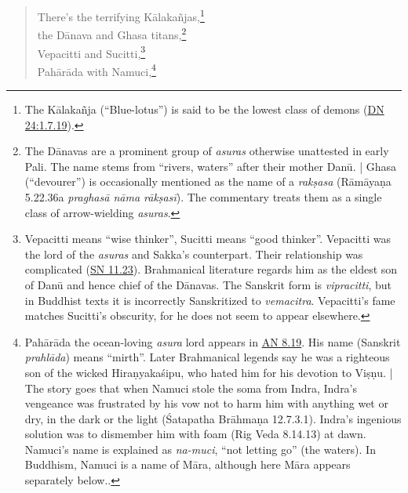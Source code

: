 \documentclass[12pt,openany]{book}%
\begin{document}
\begin{verse}
There’s the terrifying \textsanskrit{Kālakañjas},\footnote{The \textsanskrit{Kālakañja} (“Blue-lotus”) is said to be the lowest class of demons (\href{https://suttacentral.net/dn24/en/sujato\#1.7.19}{DN 24:1.7.19}). } \\
the \textsanskrit{Dānava} and Ghasa titans,\footnote{The \textsanskrit{Dānavas} are a prominent group of \textit{asuras} otherwise unattested in early Pali. The name stems from “rivers, waters” after their mother \textsanskrit{Danū}. | Ghasa (“devourer”) is occasionally mentioned as the name of a \textit{\textsanskrit{rakṣasa}} (\textsanskrit{Rāmāyaṇa} 5.22.36a \textit{\textsanskrit{praghasā} \textsanskrit{nāma} \textsanskrit{rākṣasī}}). The commentary treats them as a single class of arrow-wielding \textit{asuras}. } \\
Vepacitti and Sucitti,\footnote{Vepacitti means “wise thinker”, Sucitti means “good thinker”. Vepacitti was the lord of the \textit{asuras} and Sakka’s counterpart. Their relationship was complicated (\href{https://suttacentral.net/sn11.23/en/sujato}{SN 11.23}). Brahmanical literature regards him as the eldest son of \textsanskrit{Danū} and hence chief of the \textsanskrit{Dānavas}. The Sanskrit form is \textit{vipracitti}, but in Buddhist texts it is incorrectly Sanskritized to \textit{vemacitra}. Vepacitti’s fame matches Sucitti’s obscurity, for he does not seem to appear elsewhere. } \\
\textsanskrit{Pahārāda} with Namuci,\footnote{\textsanskrit{Pahārāda} the ocean-loving \textit{asura} lord appears in \href{https://suttacentral.net/an8.19/en/sujato}{AN 8.19}. His name (Sanskrit \textit{\textsanskrit{prahlāda}}) means “mirth”. Later Brahmanical legends say he was a righteous son of the wicked \textsanskrit{Hiraṇyakaśipu}, who hated him for his devotion to \textsanskrit{Viṣṇu}. | The story goes that when Namuci stole the soma from Indra, Indra’s vengeance was frustrated by his vow not to harm him with anything wet or dry, in the dark or the light (Śatapatha \textsanskrit{Brāhmaṇa} 12.7.3.1). Indra’s ingenious solution was to dismember him with foam (Rig Veda 8.14.13) at dawn. Namuci’s name is explained as \textit{na-muci}, “not letting go” (the waters). In Buddhism, Namuci is a name of \textsanskrit{Māra}, although here \textsanskrit{Māra} appears separately below.. } 


\end{verse}
\end{document}
